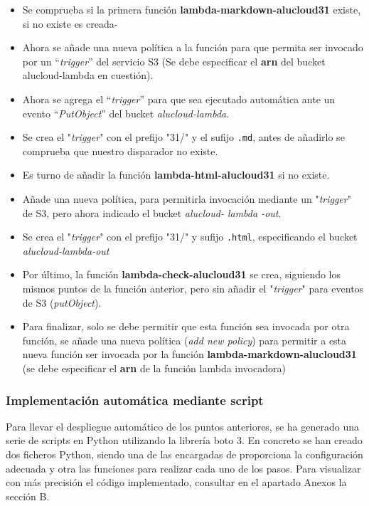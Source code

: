 \documentclass[
]{article}
\begin{document}
\begin{itemize}
\item
  Se comprueba si la primera función \textbf{lambda-markdown-alucloud31}
  existe, si no existe es creada-
\item
  Ahora se añade una nueva política a la función para que permita ser
  invocado por un ``\emph{trigger}'' del servicio S3 (Se debe
  especificar el \textbf{arn} del bucket alucloud-lambda en cuestión).
\item
  Ahora se agrega el ``\emph{trigger}'' para que sea ejecutado
  automática ante un evento ``\emph{PutObject}'' del bucket
  \emph{alucloud-lambda}.
\item
  Se crea el "\emph{trigger}" con el prefijo "31/" y el sufijo
  \texttt{.md}, antes de añadirlo se comprueba que nuestro disparador no
  existe.
\item
  Es turno de añadir la función \textbf{lambda-html-alucloud31} si no
  existe.
\item
  Añade una nueva política, para permitirla invocación mediante un
  "\emph{trigger}" de S3, pero ahora indicado el bucket \emph{alucloud-
  lambda -out}.
\item
  Se crea el "\emph{trigger}" con el prefijo "31/" y sufijo
  \texttt{.html}, especificando el bucket \emph{alucloud-lambda-out}
\item
  Por último, la función \textbf{lambda-check-alucloud31} se crea,
  siguiendo los mismos puntos de la función anterior, pero sin añadir el
  "\emph{trigger}" para eventos de S3 (\emph{putObject}).
\item
  Para finalizar, solo se debe permitir que esta función sea invocada
  por otra función, se añade una nueva política (\emph{add new policy})
  para permitir a esta nueva función ser invocada por la función
  \textbf{lambda-markdown-alucloud31} (se debe especificar el
  \textbf{arn} de la función lambda invocadora)
\end{itemize}
\leavevmode
\newline
\hypertarget{header-n144}{%
\subsubsection{Implementación automática mediante
script}\label{header-n144}}
\leavevmode
\newline
Para llevar el despliegue automático de los puntos anteriores, se ha
generado una serie de scripts en Python utilizando la librería boto 3.
En concreto se han creado dos ficheros Python, siendo una de las
encargadas de proporciona la configuración adecuada y otra las funciones
para realizar cada uno de los pasos. Para visualizar con más precisión
el código implementado, consultar en el apartado Anexos la sección B.
\end{document}
